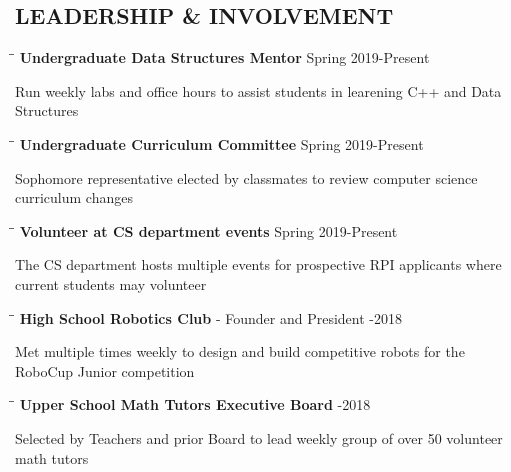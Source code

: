 \documentclass{res}
\begin{document}
\begin{resume}
\section{LEADERSHIP \& INVOLVEMENT}
	\vspace{-0.1in}
	\begin{tabbing}
   \hspace{2.3in}\= \hspace{3.4in}\= \kill
    {\bf Undergraduate Data Structures Mentor} \>  \>Spring 2019-Present
   \end{tabbing}\vspace{-20pt}
	Run weekly labs and office hours to assist students in learening C++ and Data Structures
    \vspace{-15pt}
    \begin{tabbing}
   \hspace{2.3in}\= \hspace{3.4in}\= \kill
    {\bf Undergraduate Curriculum Committee} \>  \>Spring 2019-Present
   \end{tabbing}\vspace{-20pt}
	Sophomore representative elected by classmates to review computer science curriculum changes
	\vspace{-15pt}
    \begin{tabbing}
   \hspace{2.3in}\= \hspace{3.4in}\= \kill
    {\bf Volunteer at CS department events} \>  \>Spring 2019-Present
   \end{tabbing}\vspace{-20pt}
	 The CS department hosts multiple events for prospective RPI applicants where current students may volunteer
	 \vspace{-15pt}
    \begin{tabbing}
   \hspace{2.3in}\= \hspace{4in}\= \kill
    {\bf High School Robotics Club} - Founder and President \>  -2018
   \end{tabbing}\vspace{-20pt}
	 Met multiple times weekly to design and build competitive robots for the RoboCup Junior competition
    \vspace{-15pt}
    \begin{tabbing}
   \hspace{2.3in}\= \hspace{4in}\= \kill
    {\bf Upper School Math Tutors Executive Board} \>  -2018
   \end{tabbing}\vspace{-20pt}
	 Selected by Teachers and prior Board to lead weekly group of over 50 volunteer math tutors




\end{resume}
\end{document}
